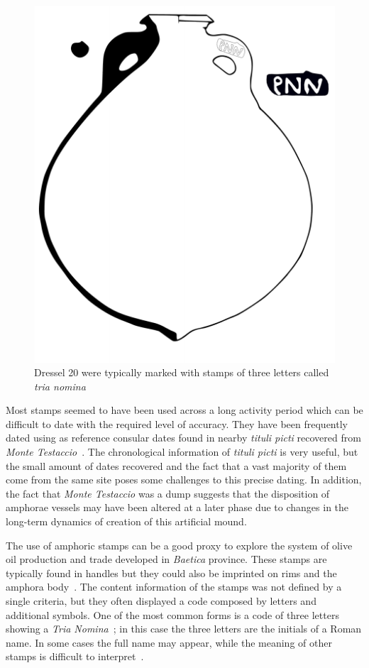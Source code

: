 \begin{figure}[htp]
	\centering
\includegraphics[scale=0.5]{dressel20}
\caption{Dressel 20 were typically marked with stamps of three letters called \textit{tria nomina}}
\label{amphora}
\end{figure} 
Most stamps seemed to have been used across a long activity period which can be difficult to date with the required level of accuracy. They have been frequently dated using as reference consular dates found in nearby \textit{tituli picti} recovered from \textit{Monte Testaccio}~\citep{Testaccio1, berni_millet_epigrafianforica_2008}.
The chronological information of \textit{tituli picti} is very useful, but the small amount of dates recovered and the fact that a vast majority of them come from the same site poses some challenges to this precise dating. In addition, the fact that \textit{Monte Testaccio} was a dump suggests that the disposition of amphorae vessels may have been altered at a later phase due to changes in the long-term dynamics of creation of this artificial mound.

The use of amphoric stamps can be a good proxy to explore the system of olive oil production and trade developed in \textit{Baetica} province. These stamps are typically found in handles but they could also be imprinted on rims and the amphora body~\citep{millet_anforas_1998}. The content information of the stamps was not defined by a single criteria, but they often displayed a code composed by letters and additional symbols. One of the most common forms is a code of three letters showing a \textit{Tria Nomina}~\citep{berni_millet_amphora_1996}; in this case the three letters are the initials of a Roman name. In some cases the full name may appear, while the meaning of other stamps is difficult to interpret~\citep{rodriguez_baetican_1998}. 

